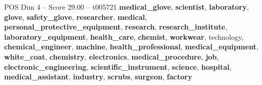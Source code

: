 \begin{textsample}{POS Dim 4 – Score 29.00 – t005721}  \label{ex:f4_pos_018}
\textbf{medical\_glove}, \textbf{scientist}, \textbf{laboratory}, \textbf{glove}, \textbf{safety\_glove}, \textbf{researcher}, \textbf{medical}, \textbf{personal\_protective\_equipment}, \textbf{research}, \textbf{research\_institute}, \textbf{laboratory\_equipment}, \textbf{health\_care}, \textbf{chemist}, \textbf{workwear}, technology, \textbf{chemical\_engineer}, \textbf{machine}, \textbf{health\_professional}, \textbf{medical\_equipment}, \textbf{white\_coat}, \textbf{chemistry}, \textbf{electronics}, \textbf{medical\_procedure}, \textbf{job}, \textbf{electronic\_engineering}, \textbf{scientific\_instrument}, \textbf{science}, \textbf{hospital}, \textbf{medical\_assistant}, \textbf{industry}, \textbf{scrubs}, \textbf{surgeon}, \textbf{factory}

\end{textsample}
